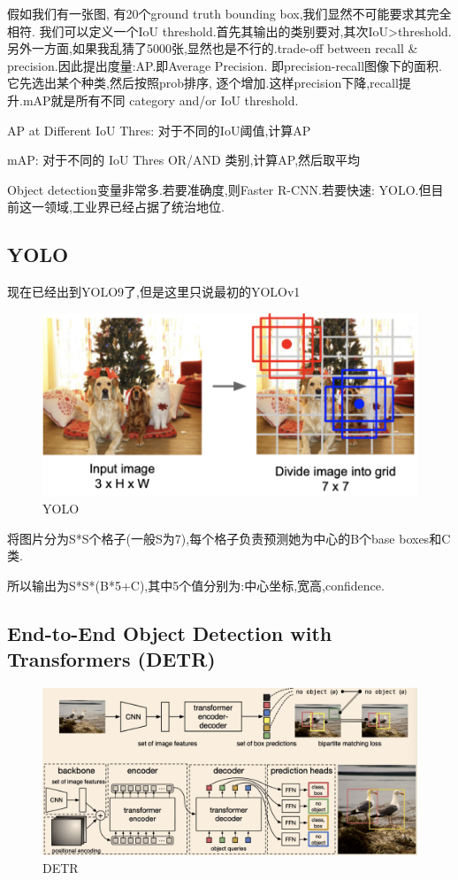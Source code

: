 假如我们有一张图,
有20个ground truth bounding box,我们显然不可能要求其完全相符.
我们可以定义一个IoU threshold.首先其输出的类别要对,其次IoU>threshold.
另外一方面,如果我乱猜了5000张,显然也是不行的.trade-off between
recall \& precision.因此提出度量:AP.即Average Precision.
即precision-recall图像下的面积.它先选出某个种类,然后按照prob排序,
逐个增加.这样precision下降,recall提升.mAP就是所有不同
category and/or IoU threshold.

AP at Different IoU Thres: 对于不同的IoU阈值,计算AP

mAP: 对于不同的 IoU Thres OR/AND 类别,计算AP,然后取平均

Object detection变量非常多.若要准确度,则Faster R-CNN.若要快速:
YOLO.但目前这一领域,工业界已经占据了统治地位.

\subsection{YOLO}

现在已经出到YOLO9了,但是这里只说最初的YOLOv1

\begin{figure}[htbp]
    \centering
    \includegraphics[scale=0.3]{figures/YOLO.png}
    \caption{YOLO}
    \label{fig:YOLO}
\end{figure}

将图片分为S*S个格子(一般S为7),每个格子负责预测她为中心的B个base boxes和C类.

所以输出为S*S*(B*5+C),其中5个值分别为:中心坐标,宽高,confidence.

\subsection{End-to-End Object Detection with Transformers (DETR)}

\begin{figure}[htbp]
    \centering
    \includegraphics[scale=0.2]{figures/DETR.png}
    \caption{DETR}
    \label{fig:DETR}
\end{figure}



